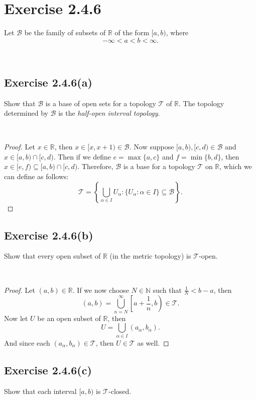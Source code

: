 \documentclass[12pt]{article}
\newenvironment{problem}
    {\begin{lrbox}{\mybox}\begin{minipage}{\textwidth-10pt}}
    {\end{minipage}\end{lrbox}\framebox[6.5in]{\usebox{\mybox}}\\}
\newcommand{\N}{\mathbb{N}}
\newcommand{\R}{\mathbb{R}}
\newcommand{\T}{\mathscr{T}}
\newcommand{\B}{\mathscr{B}}
\begin{document}
\section*{Exercise 2.4.6}
\begin{problem}
    Let $\B$ be the family of subsets of $\R$ of the form $[a,b)$, where
    \[-\infty < a < b <\infty.\]
\end{problem}

\subsection*{Exercise 2.4.6(a)}
\begin{problem}
    Show that $\B$ is a base of open sets for a topology $\T$ of $\R$. The topology determined by $\B$ is the \emph{half-open interval topology}.
\end{problem}

\begin{proof}
    Let $x\in\R$, then $x\in[x,x+1)\in\B$. Now suppose $[a,b),[c,d)\in\B$ and $x\in[a,b)\cap[c,d)$. Then if we define $e=\max\{a,c\}$ and $f=\min\{b,d\}$, then $x\in[e,f)\subseteq[a,b)\cap[c,d)$. Therefore, $\B$ is a base for a topology $\T$ on $\R$, which we can define as follows:
    \[\T = \left\{\bigcup_{\alpha\in I}U_\alpha : \{U_\alpha : \alpha\in I\} \subseteq \B\right\}.\]
    
\end{proof}

\subsection*{Exercise 2.4.6(b)}
\begin{problem}
    Show that every open subset of $\R$ (in the metric topology) is $\T$-open.
\end{problem}

\begin{proof}
    Let $(a,b)\in\R$. If we now choose $N\in\N$ such that $\frac1N < b-a$, then
    \[(a,b) = \bigcup_{n=N}^\infty\left[a+\frac1n, b\right) \in \T.\]
    Now let $U$ be an open subset of $\R$, then
    \[U = \bigcup_{\alpha\in I} (a_\alpha, b_\alpha).\]
    And since each $(a_\alpha, b_\alpha)\in\T$, then $U\in\T$ as well.
    
\end{proof}

\subsection*{Exercise 2.4.6(c)}
\begin{problem}
    Show that each interval $[a,b)$ is $\T$-closed.
\end{problem}
\end{document}
